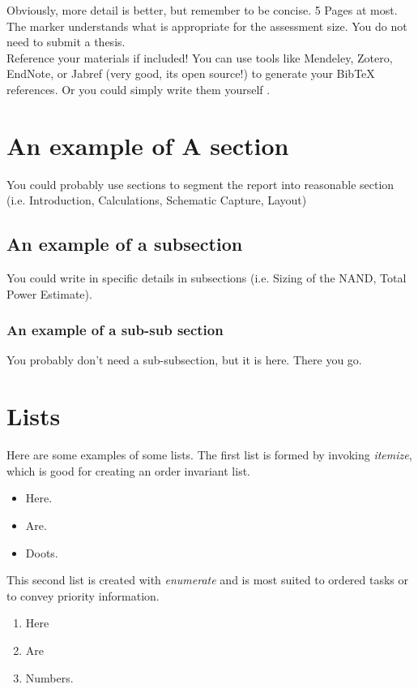 \documentclass[conference,10pt]{IEEEtran}
\begin{document}
    Obviously, more detail is better, but remember to be concise. 5 Pages at most. The marker understands what is appropriate for the assessment size. You do not need to submit a thesis. \\
    
    Reference your materials if included! You can use tools like Mendeley, Zotero, EndNote, or Jabref (very good, its open source!) to generate your BibTeX references. Or you could simply write them yourself \cite{tmb}.
    
\section{An example of A section}
    You could probably use sections to segment the report into reasonable section (i.e. Introduction, Calculations, Schematic Capture, Layout)
    \subsection{An example of a subsection}
        You could write in specific details in subsections (i.e. Sizing of the NAND, Total Power Estimate).
        \subsubsection{An example of a sub-sub section}
            You probably don't need a sub-subsection, but it is here. There you go.
            
\section{Lists}
    Here are some examples of some lists. The first list is formed by invoking \textit{itemize}, which is good for creating an order invariant list.
    
    \begin{itemize}
        \item Here.
        \item Are.
        \item Doots.
    \end{itemize}
    
    This second list is created with \textit{enumerate} and is most suited to ordered tasks or to convey priority information.
    \begin{enumerate}
        \item Here
        \item Are
        \item Numbers.
    \end{enumerate}
\end{document}
